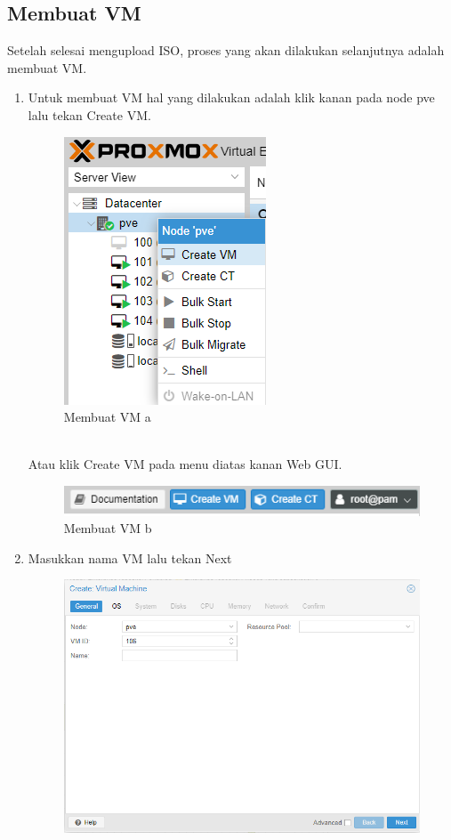 \documentclass{article}
\begin{document}
  \subsection{Membuat VM}
  Setelah selesai mengupload ISO, proses yang akan dilakukan selanjutnya adalah membuat VM.
  \begin{enumerate}
  \item Untuk membuat VM hal yang dilakukan adalah klik kanan pada node pve lalu tekan Create VM.
  \begin{figure}[h!]
    \centering
    \includegraphics[width=0.7\linewidth]{create vm 1 a.png}
    \caption{Membuat VM a}
  \end{figure}
  \\ Atau klik Create VM pada menu diatas kanan Web GUI.
  \begin{figure}[h!]
    \centering
    \includegraphics[width=0.7\linewidth]{create vm 1 b.png}
    \caption{Membuat VM b}
  \end{figure}
  \newpage
  \item Masukkan nama VM lalu tekan Next
  \begin{figure}[h!]
    \centering
    \includegraphics[width=0.7\linewidth]{create vm 2 a.png}

\end{figure}
\end{enumerate}
\end{document}
